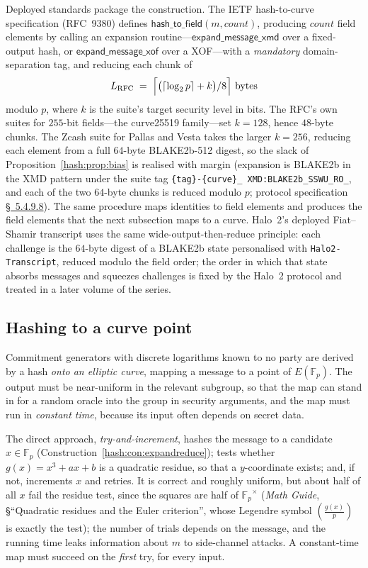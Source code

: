 \documentclass[11pt,a4paper]{article}
\theoremstyle{definition}
\theoremstyle{remark}
\newcommand{\Fp}{\ensuremath{\mathbb{F}_{p}}}
\newcommand{\legendre}[2]{\left(\frac{#1}{#2}\right)}
\begin{document}
Deployed standards package the construction. The IETF hash-to-curve
specification (RFC~9380) defines
\(\mathsf{hash\_to\_field}(m, \mathit{count})\), producing
\(\mathit{count}\) field elements by calling an expansion
routine---\(\mathsf{expand\_message\_xmd}\) over a fixed-output hash,
or \(\mathsf{expand\_message\_xof}\) over a XOF---with a
\emph{mandatory} domain-separation tag, and reducing each chunk of
\[
L_{\mathrm{RFC}} \;=\; \Bigl\lceil
\bigl(\lceil \log_{2} p \rceil + k\bigr)/8 \Bigr\rceil
\ \text{bytes}
\]
modulo \(p\), where \(k\) is the suite's target security level in
bits. The RFC's own suites for \(255\)-bit fields---the curve25519
family---set \(k = 128\), hence \(48\)-byte chunks. The Zcash suite
for Pallas and Vesta takes the larger \(k = 256\), reducing each
element from a full \(64\)-byte BLAKE2b-512 digest, so the slack of
Proposition~\ref{hash:prop:bias} is realised with margin
(expansion is BLAKE2b in the XMD pattern under the suite tag
\texttt{\{tag\}-\allowbreak\{curve\}\_\allowbreak
XMD:BLAKE2b\_\allowbreak SSWU\_RO\_}, and each of the two \(64\)-byte
chunks is reduced modulo \(p\); protocol specification
\href{https://zips.z.cash/protocol/protocol.pdf\#concretegrouphashpallasandvesta}{\S~5.4.9.8}).
The same procedure maps identities to field elements and produces the
field elements that the next subsection maps to a curve. Halo~2's
deployed Fiat--Shamir transcript uses the same wide-output-then-reduce
principle: each challenge is the
\(64\)-byte digest of a BLAKE2b state personalised with
\texttt{Halo2-Transcript}, reduced modulo the field order; the
order in which that state absorbs messages and squeezes challenges is
fixed by the Halo~2 protocol and treated in a later volume of the
series.

\subsection{Hashing to a curve point}\label{hash:subsec:hashtocurve}

Commitment generators with discrete logarithms known to no party are
derived by a hash \emph{onto an elliptic curve}, mapping a message to
a point of \(E(\Fp)\). The output must be near-uniform in the relevant
subgroup, so that the map can stand in for a random oracle into the
group in security arguments, and the map must run in \emph{constant
time}, because its input often depends on secret data.

The direct approach, \emph{try-and-increment}, hashes the message to a
candidate \(x \in \Fp\) (Construction~\ref{hash:con:expandreduce});
tests whether \(g(x) = x^{3} + ax + b\) is a quadratic residue, so
that a \(y\)-coordinate exists; and, if not, increments \(x\) and
retries. It is correct and roughly uniform, but about half of all
\(x\) fail the residue test, since the squares are half of
\(\Fp^{\times}\) (\emph{Math Guide}, \S``Quadratic residues and the
Euler criterion'', whose Legendre symbol \(\legendre{g(x)}{p}\) is
exactly the test); the number of trials depends on the message, and
the running time leaks information about \(m\) to side-channel
attacks. A constant-time map must succeed on the \emph{first} try,
for every input.
\end{document}
